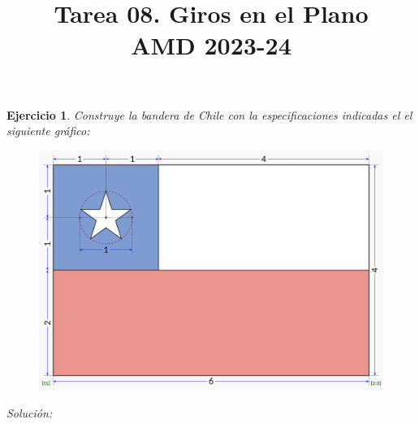 \documentclass{amsart}
\title{Tarea 08. Giros en el Plano \\ AMD 2023-24}
\newtheorem{ejer}{Ejercicio}
\begin{document}
\maketitle

\begin{ejer}
Construye la bandera de Chile con la especificaciones indicadas el el siguiente gráfico:

\begin{figure}[H]
\centering
\includegraphics[width = 12cm]{Chile.png}
\end{figure}
\end{ejer}

{\it Solución:}

\end{document}
